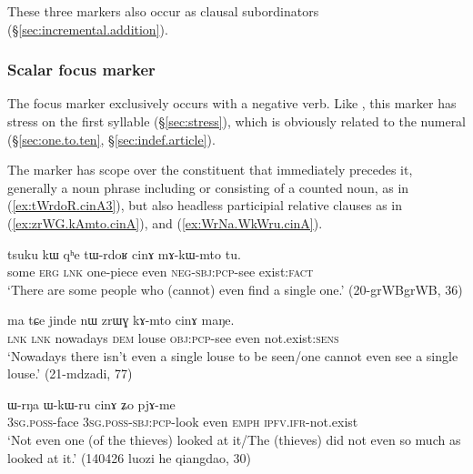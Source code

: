 These three markers also occur as clausal subordinators (§\ref{sec:incremental.addition}).
 
  
 \subsubsection{Scalar focus marker } \label{sec:cinA} 
 The focus marker  exclusively occurs with a negative verb. Like , this marker has stress on the first syllable  (§\ref{sec:stress}), which is obviously related to the numeral  (§\ref{sec:one.to.ten}, §\ref{sec:indef.article}).
 
 The marker  has scope over the constituent that immediately precedes it, generally a noun phrase including or consisting of a counted noun, as in (\ref{ex:tWrdoR.cinA3}), but also headless participial relative clauses as in (\ref{ex:zrWG.kAmto.cinA}), and (\ref{ex:WrNa.WkWru.cinA}).
 
 \begin{exe}
\ex \label{ex:tWrdoR.cinA3}
\gll tsuku kɯ qʰe tɯ-rdoʁ cinɤ mɤ-kɯ-mto tu. \\
some \textsc{erg} \textsc{lnk} one-piece even \textsc{neg}-\textsc{sbj}:\textsc{pcp}-see exist:\textsc{fact} \\
\glt `There are some people who (cannot) even find a single one.' (20-grWBgrWB, 36)
 \end{exe} 
 
 \begin{exe}
\ex \label{ex:zrWG.kAmto.cinA}
\gll  ma tɕe jinde nɯ zrɯɣ kɤ-mto cinɤ maŋe. \\
\textsc{lnk} \textsc{lnk} nowadays \textsc{dem} louse \textsc{obj}:\textsc{pcp}-see even not.exist:\textsc{sens} \\
\glt `Nowadays there isn't even a single louse to be seen/one cannot even see a single louse.' (21-mdzadi, 77)
\end{exe} 

\begin{exe}
\ex \label{ex:WrNa.WkWru.cinA}
\gll ɯ-rŋa ɯ-kɯ-ru cinɤ ʑo pjɤ-me \\
\textsc{3sg}.\textsc{poss}-face \textsc{3sg}.\textsc{poss}-\textsc{sbj}:\textsc{pcp}-look even \textsc{emph} \textsc{ipfv}.\textsc{ifr}-not.exist \\
\glt `Not even one (of the thieves) looked at it/The (thieves) did not even so much as looked at it.' (140426 luozi he qiangdao, 30)
\end{exe}

